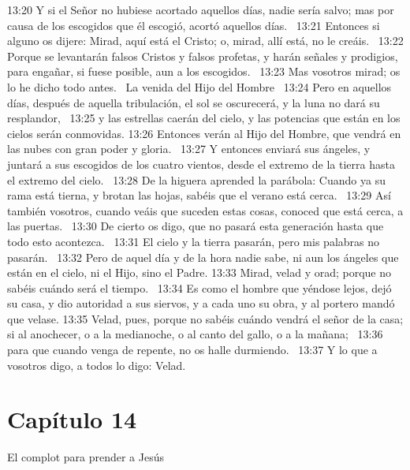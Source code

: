 13:20 Y si el Señor no hubiese acortado aquellos días, nadie sería salvo; mas por causa de los escogidos que él escogió, acortó aquellos días.  
13:21 Entonces si alguno os dijere: Mirad, aquí está el Cristo; o, mirad, allí está, no le creáis.  
13:22 Porque se levantarán falsos Cristos y falsos profetas, y harán señales y prodigios, para engañar, si fuese posible, aun a los escogidos.  
13:23 Mas vosotros mirad; os lo he dicho todo antes.  
La venida del Hijo del Hombre   
13:24 Pero en aquellos días, después de aquella tribulación, el sol se oscurecerá, y la luna no dará su resplandor,  
13:25 y las estrellas caerán del cielo, y las potencias que están en los cielos serán conmovidas. 
13:26 Entonces verán al Hijo del Hombre, que vendrá en las nubes con gran poder y gloria.  
13:27 Y entonces enviará sus ángeles, y juntará a sus escogidos de los cuatro vientos, desde el extremo de la tierra hasta el extremo del cielo.  
13:28 De la higuera aprended la parábola: Cuando ya su rama está tierna, y brotan las hojas, sabéis que el verano está cerca.  
13:29 Así también vosotros, cuando veáis que suceden estas cosas, conoced que está cerca, a las puertas.  
13:30 De cierto os digo, que no pasará esta generación hasta que todo esto acontezca.  
13:31 El cielo y la tierra pasarán, pero mis palabras no pasarán.  
13:32 Pero de aquel día y de la hora nadie sabe, ni aun los ángeles que están en el cielo, ni el Hijo, sino el Padre. 
13:33 Mirad, velad y orad; porque no sabéis cuándo será el tiempo.  
13:34 Es como el hombre que yéndose lejos, dejó su casa, y dio autoridad a sus siervos, y a cada uno su obra, y al portero mandó que velase. 
13:35 Velad, pues, porque no sabéis cuándo vendrá el señor de la casa; si al anochecer, o a la medianoche, o al canto del gallo, o a la mañana;  
13:36 para que cuando venga de repente, no os halle durmiendo.  
13:37 Y lo que a vosotros digo, a todos lo digo: Velad.  
\section*{Capítulo 14}
El complot para prender a Jesús   

